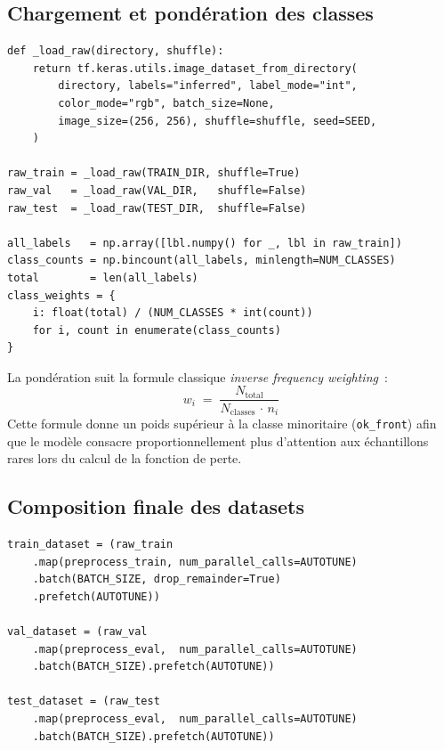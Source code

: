 \documentclass[12pt,a4paper,openany]{report}
\begin{document}
\subsection{Chargement et pondération des classes}

\begin{lstlisting}[caption={Chargement \texttt{tf.data} et calcul des poids de classes.}]
def _load_raw(directory, shuffle):
    return tf.keras.utils.image_dataset_from_directory(
        directory, labels="inferred", label_mode="int",
        color_mode="rgb", batch_size=None,
        image_size=(256, 256), shuffle=shuffle, seed=SEED,
    )

raw_train = _load_raw(TRAIN_DIR, shuffle=True)
raw_val   = _load_raw(VAL_DIR,   shuffle=False)
raw_test  = _load_raw(TEST_DIR,  shuffle=False)

all_labels   = np.array([lbl.numpy() for _, lbl in raw_train])
class_counts = np.bincount(all_labels, minlength=NUM_CLASSES)
total        = len(all_labels)
class_weights = {
    i: float(total) / (NUM_CLASSES * int(count))
    for i, count in enumerate(class_counts)
}
\end{lstlisting}

La pondération suit la formule classique \emph{inverse frequency weighting}~:
\begin{equation}
w_i \;=\; \frac{N_\text{total}}{N_\text{classes}\,\cdot\,n_i}
\label{eq:classweight}
\end{equation}
Cette formule donne un poids supérieur à la classe minoritaire (\texttt{ok\_front}) afin que le modèle consacre proportionnellement plus d'attention aux échantillons rares lors du calcul de la fonction de perte.

\subsection{Composition finale des datasets}

\begin{lstlisting}[caption={Composition finale~: \texttt{.map()} -> \texttt{.batch()} -> \texttt{.prefetch()}.}]
train_dataset = (raw_train
    .map(preprocess_train, num_parallel_calls=AUTOTUNE)
    .batch(BATCH_SIZE, drop_remainder=True)
    .prefetch(AUTOTUNE))

val_dataset = (raw_val
    .map(preprocess_eval,  num_parallel_calls=AUTOTUNE)
    .batch(BATCH_SIZE).prefetch(AUTOTUNE))

test_dataset = (raw_test
    .map(preprocess_eval,  num_parallel_calls=AUTOTUNE)
    .batch(BATCH_SIZE).prefetch(AUTOTUNE))
\end{lstlisting}
\end{document}
